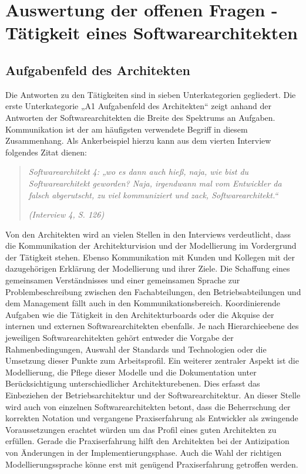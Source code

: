 

\section{Auswertung der offenen Fragen - Tätigkeit eines Softwarearchitekten}

\subsection{Aufgabenfeld des Architekten}

Die Antworten zu den Tätigkeiten sind in sieben Unterkategorien gegliedert. Die erste  Unterkategorie „A1 Aufgabenfeld des Architekten“ zeigt anhand der Antworten der Softwarearchitekten die Breite des Spektrums an Aufgaben. Kommunikation ist der am häufigsten verwendete Begriff in diesem Zusammenhang. 
Als Ankerbeispiel hierzu kann aus dem vierten Interview folgendes Zitat dienen: 

\begin{quote}
\textit{Softwarearchitekt 4: „wo es dann auch hieß, naja, wie bist du Softwarearchitekt geworden? Naja, irgendwann mal vom Entwickler da falsch abgerutscht, zu viel kommuniziert und zack, Softwarearchitekt.“}

\hfill \textit{(Interview 4, S. 126)}
\end{quote}

Von den Architekten wird an vielen Stellen in den Interviews verdeutlicht, dass die Kommunikation der Architekturvision und der Modellierung im Vordergrund der Tätigkeit stehen. Ebenso Kommunikation mit Kunden und Kollegen mit der dazugehörigen Erklärung der Modellierung und ihrer Ziele. Die Schaffung eines gemeinsamen Verständnisses und einer gemeinsamen Sprache zur Problembeschreibung zwischen den Fachabteilungen, den Betriebsabteilungen und dem Management fällt auch in den Kommunikationsbereich.
Koordinierende Aufgaben wie die Tätigkeit in den Architekturboards oder die Akquise der internen und externen Softwarearchitekten ebenfalls. Je nach Hierarchieebene des jeweiligen Softwarearchitekten gehört entweder die Vorgabe der Rahmenbedingungen, Auswahl der Standards und Technologien oder die Umsetzung dieser Punkte zum Arbeitsprofil. 
Ein weiterer zentraler Aspekt ist die Modellierung, die Pflege dieser Modelle und die Dokumentation unter Berücksichtigung unterschiedlicher Architekturebenen. Dies erfasst das Einbeziehen der Betriebsarchitektur und der Softwarearchitektur. An dieser Stelle wird auch von einzelnen Softwarearchitekten betont, dass die Beherrschung der korrekten Notation und vergangene Praxiserfahrung als Entwickler als zwingende Voraussetzungen erachtet würden um das Profil eines guten Architekten zu erfüllen. Gerade die Praxiserfahrung hilft den Architekten bei der Antizipation von Änderungen in der Implementierungsphase. Auch die Wahl der richtigen Modellierungssprache könne erst mit genügend Praxiserfahrung getroffen werden.


